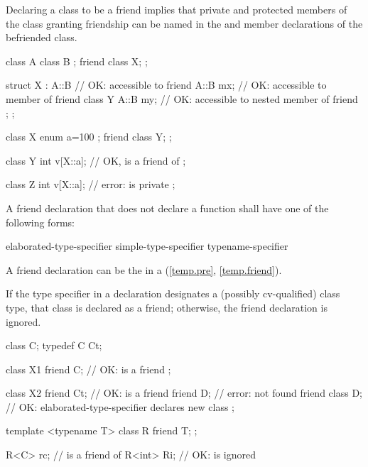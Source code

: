 \pnum
{}%
Declaring a class to be a friend implies that private and
protected members of the class granting friendship can be named in the
 and member declarations of the befriended
class.
\begin{example}
\begin{codeblock}
class A {
  class B { };
  friend class X;
};

struct X : A::B {               // OK:  accessible to friend
  A::B mx;                      // OK:  accessible to member of friend
  class Y {
    A::B my;                    // OK:  accessible to nested member of friend
  };
};
\end{codeblock}
\end{example}
\begin{example}
\begin{codeblock}
class X {
  enum { a=100 };
  friend class Y;
};

class Y {
  int v[X::a];                  // OK,  is a friend of 
};

class Z {
  int v[X::a];                  // error:  is private
};
\end{codeblock}
\end{example}

\pnum
A friend declaration that does not declare a function
shall have one of the following forms:

\begin{ncsimplebnf}
 elaborated-type-specifier \terminal{;}\br
{} simple-type-specifier \terminal{;}\br
{} typename-specifier \terminal{;}
\end{ncsimplebnf}

\begin{note}
A friend declaration can be the
 in a 
(\ref{temp.pre}, \ref{temp.friend}).
\end{note}
If the
type specifier in a  declaration designates a (possibly
cv-qualified) class type, that class is declared as a friend; otherwise, the
friend declaration is ignored.
\begin{example}
\begin{codeblock}
class C;
typedef C Ct;

class X1 {
  friend C;                     // OK:  is a friend
};

class X2 {
  friend Ct;                    // OK:  is a friend
  friend D;                     // error:  not found
  friend class D;               // OK: elaborated-type-specifier declares new class
};

template <typename T> class R {
  friend T;
};

R<C> rc;                        //  is a friend of 
R<int> Ri;                      // OK:  is ignored
\end{codeblock}
\end{example}

